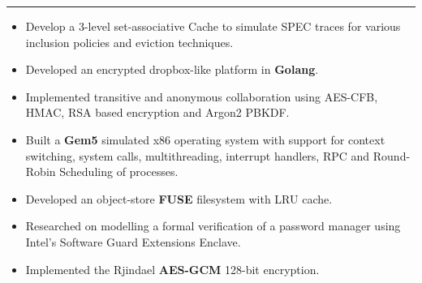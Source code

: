 \documentclass[10pt, margin=0.5in]{deedy-resume-openfont}
\begin{document}
\begin{minipage}[t]{0.47\textwidth}
\vspace{-3pt}				%
\rule{\textwidth}{0.5pt}	%
\vspace{-7pt}				%

\begin{itemize}[leftmargin=*, noitemsep]
    \item Develop a 3-level set-associative Cache to simulate SPEC traces for various 
        inclusion policies and eviction techniques.
\end{itemize}

\vspace{5pt}
\begin{itemize}[leftmargin=*, noitemsep]
  \item Developed an encrypted dropbox-like platform in \textbf{Golang}.
  \item Implemented transitive and anonymous collaboration using AES-CFB, HMAC, RSA based encryption and Argon2 PBKDF.
\end{itemize}

\vspace{5pt}
\begin{itemize}[leftmargin=*, noitemsep]
  \item Built a \textbf{Gem5} simulated x86 operating system with support for context switching, system calls, multithreading, interrupt handlers, RPC and Round-Robin Scheduling of processes.
  \item Developed an object-store \textbf{FUSE} filesystem with LRU cache.
\end{itemize}

\vspace{5pt}
\begin{itemize}[leftmargin=*, noitemsep]
  \item Researched on modelling a formal verification of a password manager using Intel's Software Guard Extensions Enclave.
  \item Implemented the Rjindael \textbf{AES-GCM} 128-bit encryption.
\end{itemize}

%
%

\end{minipage}
\end{document}
